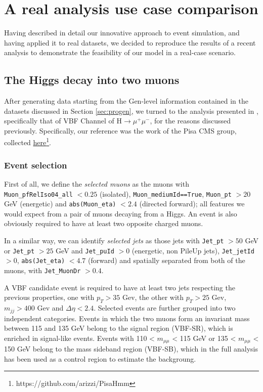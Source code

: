 \chapter{A real analysis use case comparison}\label{ch:benan} %
Having described in detail our innovative approach to event simulation, and having applied it to real datasets, we decided to reproduce the results of a recent analysis to demonstrate the feasibility of our model in a real-case scenario.

\section{The Higgs decay into two muons}
After generating data starting from the Gen-level information contained in the datasets discussed in Section \ref{sec:progen}, we turned to the analysis presented in \cite{CMS-PAS-HIG-19-006}, specifically that of VBF Channel of H$\rightarrow\mu^+\mu^-$, for the reasons discussed previously.
Specifically, our reference was the work of the Pisa CMS group, collected \href{https://github.com/arizzi/PisaHmm}{here}\footnote{https://github.com/arizzi/PisaHmm}.

\subsection{Event selection}

First of all, we define the \emph{selected muons} as the muons with\\ \texttt{Muon\_pfRelIso04\_all} $<0.25$ (isolated), \texttt{Muon\_mediumId==True}, \texttt{Muon\_pt} $>20$ GeV (energetic) and \texttt{abs(Muon\_eta)} $<2.4$ (directed forward); all features we would expect from a pair of muons decaying from a Higgs. An event is also obviously required to have at least two opposite charged muons.

In a similar way, we can identify \emph{selected jets} as those jets with \texttt{Jet\_pt} $> 50$ GeV or \texttt{Jet\_pt} $> 25$ GeV and \texttt{Jet\_puId} $>0$ (energetic, non PileUp jets), \texttt{Jet\_jetId} $>0$,  \texttt{abs(Jet\_eta)} $<4.7$ (forward) and spatially separated from both of the muons, with \texttt{Jet\_MuonDr} $>0.4$. 

A VBF candidate event is required to have at least two jets respecting the previous properties, one with $p_T>35$ Gev, the other with $p_T>25$ Gev, $m_{jj}>400$ Gev and $\Delta\eta<2.4$. Selected events are further grouped into two independent categories. Events in which the two muons form an invariant mass between 115 and
135 GeV belong to the signal region (VBF-SR), which is enriched in signal-like events. Events with 110 < $m_{\mu\mu}$ < 115 GeV or 135 < $m_{\mu\mu}$ < 150 GeV belong to the mass sideband region (VBF-SB), which in the full analysis has been used as a control region to estimate the backgroung.

